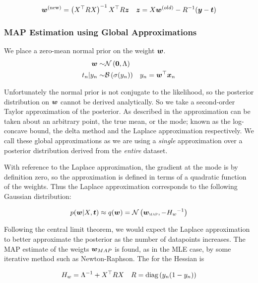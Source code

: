 \begin{align}
\bm w^{(\text{new})} & = \left(X^\top R X \right)^{-1} X^\top R \bm z & \bm z = X \bm w^{(old)}-R^{-1}(\bm y - \bm t)
\end{align}


\subsubsection*{MAP Estimation using Global Approximations}
\newcommand \wmap[0] { \vv{w}_{\text{\tiny \sc MAP}} }

We place a zero-mean normal prior on the weight $\bm w$.
\begin{align}\bm w \sim & \mathcal{N} \left( {\bm 0}, {\Lambda} \right) \\
t_n | y_n \sim & \mathcal{B}\left( \sigma(y_n) \right) & y_n = \bm w^\top\bm x_n  \label{eqn:bayes-logit-model}
\end{align}

Unfortunately the normal prior is not conjugate to the likelihood, so the posterior distribution on $\bm w$ cannot be derived analytically. So we take a second-order Taylor approximation of the posterior. As described in \cite{Wang2013} the approximation can be taken about an arbitrary point, the true mean, or the mode; known as the log-concave bound, the delta method and the Laplace approximation respectively. We call these global approximations as we are using a \emph{single} approximation over a posterior distribution derived from the \emph{entire} dataset.

With reference to the Laplace approximation, the gradient at the mode is by definition zero, so the approximation is defined in terms of a quadratic function of the weights. Thus the Laplace approximation corresponds to the following Gaussian distribution:

\begin{equation}
p(\vv{w}|X,\vv{t}) \approx q(\vv{w}) = \nor{\wmap}{-\inv{H_w}}
\end{equation}

Following the central limit theorem, we would expect the Laplace approximation to better approximate the posterior as the number of datapoints increases. The MAP estimate of the weigts $\bm w_{MAP}$ is found, as in the MLE case, by some iterative method such as Newton-Raphson. The for the Hessian is

\begin{align}
H_w   & = {\Lambda}^{-1} + X^\top R X & R = \text{diag} \left( {y_n(1 - y_n)} \right) 
\end{align}

